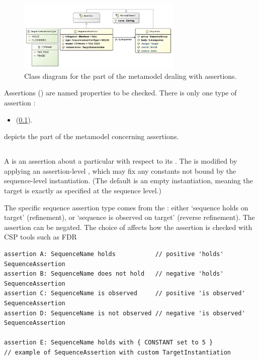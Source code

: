 \begin{figure}[htb]
	\centering
	\includegraphics[width=0.7\textwidth]{diagrams/Assertions}
	\caption{Class diagram for the part of the \langname{} metamodel dealing with assertions.}
	\label{fig:metamodel-assertions}
\end{figure}

Assertions (\massertion) are named properties to be checked.  There is
only one type of assertion :

\begin{itemize}
\item \msequenceassertion{} (\cref{ssec:metamodel-assertions-sequence}).
\end{itemize}


 depicts the part of the metamodel concerning
assertions.



\subsection{\msequenceassertion}\label{ssec:metamodel-assertions-sequence}

A \msequenceassertion{} is an assertion about a particular \msequence{} with
respect to its \mtarget.  The \mtarget{} is modified by applying an
assertion-level \mtargetinstantiation, which may fix any constants not bound
by the sequence-level instantiation.  (The default is an empty instantiation,
meaning the target is exactly as specified at the sequence level.)

The specific sequence assertion type comes from the \msequenceassertiontype:
either `sequence holds on target' (refinement), or `sequence is observed on
target' (reverse refinement).  The assertion can be negated.  The choice of
\mcspmodel{} affects how the assertion is checked with CSP tools such as FDR

\begin{lstlisting}[style=Example]
assertion A: SequenceName holds           // positive 'holds' SequenceAssertion
assertion B: SequenceName does not hold   // negative 'holds' SequenceAssertion
assertion C: SequenceName is observed     // positive 'is observed' SequenceAssertion
assertion D: SequenceName is not observed // negative 'is observed' SequenceAssertion

assertion E: SequenceName holds with { CONSTANT set to 5 }
// example of SequenceAssertion with custom TargetInstantiation
\end{lstlisting}


